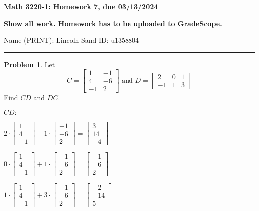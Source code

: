 \documentclass[12]{amsart}
\theoremstyle{definition}
\newtheorem{xca}{Problem}
\begin{document}
\centerline{ \bf Math 3220-1: Homework 7, due 03/13/2024}
\bigskip
\centerline{ \bf Show all work. Homework has to be uploaded to GradeScope.}
\bigskip
\noindent Name (PRINT): Lincoln Sand\hskip 2.5in ID: u1358804
\smallskip

\hrule

\bigskip
\begin{xca} %
Let
$$
C=
\begin{bmatrix}
1 & -1\\
4& -6\\
-1&2
\end{bmatrix}
\text{ and } D=
\begin{bmatrix}
2&0 &1 \\
-1 & 1 &3
\end{bmatrix}
$$
Find $CD$ and $DC$.
\end{xca}


$CD:$

$2 \cdot \begin{bmatrix}
    1 \\
    4 \\
    -1
\end{bmatrix} -1 \cdot \begin{bmatrix}
    -1 \\
    -6 \\
    2
\end{bmatrix} = \begin{bmatrix}
    3 \\
    14 \\
    -4
\end{bmatrix}$

$0 \cdot \begin{bmatrix}
    1 \\
    4 \\
    -1
\end{bmatrix} + 1 \cdot \begin{bmatrix}
    -1 \\
    -6 \\
    2
\end{bmatrix} = \begin{bmatrix}
    -1 \\
    -6 \\
    2
\end{bmatrix}$

$1 \cdot \begin{bmatrix}
    1 \\
    4 \\
    -1
\end{bmatrix} + 3 \cdot \begin{bmatrix}
    -1 \\
    -6 \\
    2
\end{bmatrix} = \begin{bmatrix}
    -2 \\
    -14 \\
    5
\end{bmatrix}$
\end{document}
